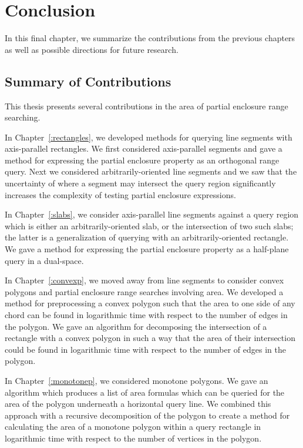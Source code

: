 \chapter{Conclusion}
\label{:conclusion}

In this final chapter, we summarize the contributions from the previous chapters as well as possible directions for future research.

\section{Summary of Contributions}
\label{:conclusion:contributions}

This thesis presents several contributions in the area of partial enclosure range searching.

In Chapter~\ref{:rectangles}, we developed methods for querying line segments with axis-parallel rectangles. 
We first considered axis-parallel segments and gave a method for expressing the partial enclosure property as an orthogonal range query. 
Next we considered arbitrarily-oriented line segments and we saw that the uncertainty of where a segment may intersect the query region significantly increases the complexity of testing partial enclosure expressions.

In Chapter~\ref{:slabs}, we consider axis-parallel line segments against a query region which is either an arbitrarily-oriented slab, or the intersection of two such slabs; the latter is a generalization of querying with an arbitrarily-oriented rectangle. 
We gave a method for expressing the partial enclosure property as a half-plane query in a dual-space.

In Chapter~\ref{:convexp}, we moved away from line segments to consider convex polygons and partial enclosure range searches involving area. 
We developed a method for preprocessing a convex polygon such that the area to one side of any chord can be found in logarithmic time with respect to the number of edges in the polygon. 
We gave an algorithm for decomposing the intersection of a rectangle with a convex polygon in such a way that the area of their intersection could be found in logarithmic time with respect to the number of edges in the polygon.

In Chapter~\ref{:monotonep}, we considered monotone polygons. 
We gave an algorithm which produces a list of area formulas which can be queried for the area of the polygon underneath a horizontal query line.
We combined this approach with a recursive decomposition of the polygon to create a method for calculating the area of a monotone polygon within a query rectangle in logarithmic time with respect to the number of vertices in the polygon. 


